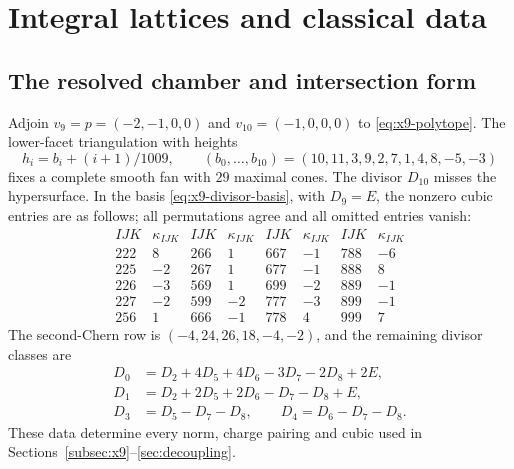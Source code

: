 \section{Integral lattices and classical data}
\label{app:integral-charges}

\subsection{The resolved chamber and intersection form}

Adjoin $v_9=p=(-2,-1,0,0)$ and $v_{10}=(-1,0,0,0)$ to
\eqref{eq:x9-polytope}. The lower-facet triangulation with heights
\begin{equation}
 h_i=b_i+(i+1)/1009,\qquad
 (b_0,\ldots,b_{10})=(10,11,3,9,2,7,1,4,8,-5,-3)
\end{equation}
fixes a complete smooth fan with $29$ maximal cones. The divisor
$D_{10}$ misses the hypersurface. In the basis
\eqref{eq:x9-divisor-basis}, with $D_9=E$, the nonzero cubic
entries are as follows; all permutations agree and all omitted
entries vanish:
\begin{equation}
\begin{array}{cc|cc|cc|cc}
 IJK&\kappa_{IJK}&IJK&\kappa_{IJK}&IJK&\kappa_{IJK}&IJK&\kappa_{IJK}\\\hline
 222&8&266&1&667&-1&788&-6\\
 225&-2&267&1&677&-1&888&8\\
 226&-3&569&1&699&-2&889&-1\\
 227&-2&599&-2&777&-3&899&-1\\
 256&1&666&-1&778&4&999&7
\end{array}
\label{eq:x9-full-cubic-data}
\end{equation}
The second-Chern row is $(-4,24,26,18,-4,-2)$, and the
remaining divisor classes are
\begin{equation}
\begin{aligned}
 D_0&=D_2+4D_5+4D_6-3D_7-2D_8+2E,\\
 D_1&=D_2+2D_5+2D_6-D_7-D_8+E,\\
 D_3&=D_5-D_7-D_8,\qquad D_4=D_6-D_7-D_8.
\end{aligned}
\end{equation}
These data determine every norm, charge pairing and cubic used
in Sections~\ref{subsec:x9}--\ref{sec:decoupling}.

